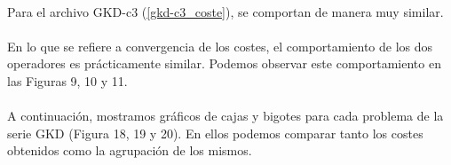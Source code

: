 	\paragraph{} Para el archivo GKD-c3  (\ref{gkd-c3_coste}), se comportan de manera muy similar.
	
	\paragraph{} En lo que se refiere a convergencia de los costes, el comportamiento de los dos operadores es prácticamente similar. Podemos observar este comportamiento en las Figuras 9, 10 y 11.
	
	\paragraph{}A continuación, mostramos gráficos de cajas y bigotes para cada problema de la serie GKD (Figura 18, 19 y 20). En ellos podemos comparar tanto los costes obtenidos como la agrupación de los mismos.
	
